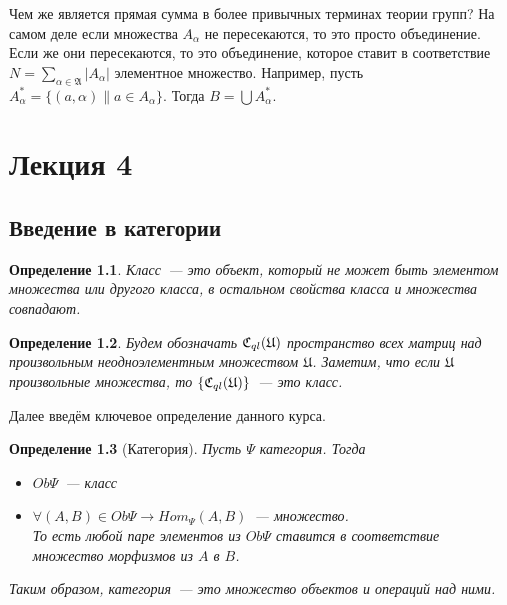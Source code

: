 \documentclass[a4paper, 12pt]{report}
\newtheorem{definition}{Определение}[chapter]
\begin{document}
Чем же является прямая сумма в более привычных терминах теории групп? На самом деле если множества $A_{\alpha}$ не пересекаются, то это просто объединение. Если же они пересекаются, то это объединение, которое ставит в соответствие $N = \sum_{\alpha\in\mathfrak{A}} |A_{\alpha}|$ элементное множество. Например, пусть $A^*_{\alpha} = \{(a, \alpha)\| a \in A_{\alpha}\}$. Тогда $B = \bigcup A^*_{\alpha}$.

\chapter{Лекция 4}
\section{Введение в категории}
\begin{definition}
Класс~--- это объект, который не может быть элементом множества или другого класса, в остальном свойства класса и множества совпадают.
\end{definition}

\begin{definition}
Будем обозначать $\mathfrak{C}_{ql}(\mathfrak{U})$ пространство всех матриц над произвольным неодноэлементным множеством $\mathfrak{U}$. Заметим, что если $\mathfrak{U}$ произвольные множества, то $\{\mathfrak{C}_{ql}(\mathfrak{U})\}$~--- это класс.
\end{definition}

Далее введём ключевое определение данного курса.

\begin{definition}[Категория]
Пусть $\Psi$ категория. Тогда
\begin{itemize}
  \item $Ob\Psi$~--- класс
  \item $\forall (A, B) \in Ob\Psi \rightarrow Hom_{\Psi} (A, B)$~--- множество. \\ То есть любой паре элементов из $Ob\Psi$ ставится в соответствие множество морфизмов из $A$ в $B$.
\end{itemize}
Таким образом, категория~--- это множество объектов и операций над ними.
\end{definition}
\end{document}
